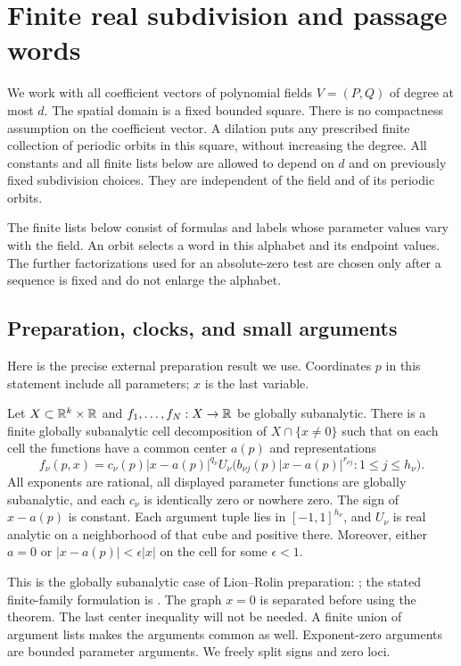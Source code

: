 \section{Finite real subdivision and passage words}
\label{sec:subdivision}

We work with all coefficient vectors of polynomial fields $V=(P,Q)$ of
degree at most $d$.  The spatial domain is a fixed bounded square.
There is no compactness assumption on the coefficient vector.  A dilation
puts any prescribed finite collection of periodic orbits in this square,
without increasing the degree.  All constants and all finite lists below
are allowed to depend on $d$ and on previously fixed subdivision choices.
They are independent of the field and of its periodic orbits.

The finite lists below consist of formulas and labels whose parameter
values vary with the field.  An orbit selects a word in this alphabet
and its endpoint values.  The further factorizations used for an
absolute-zero test are chosen only after a sequence is fixed and do
not enlarge the alphabet.

\subsection{Preparation, clocks, and small arguments}

Here is the precise external preparation result we use.  Coordinates $p$
in this statement include all parameters; $x$ is the last variable.

\begin{theorem}
\label{thm:subdivision-preparation}
Let $X\subset\mathbb{R}^k\times\mathbb{R}$ and $f_1,\ldots,f_N:X\to\mathbb{R}$ be
globally subanalytic.  There is a finite globally subanalytic cell
decomposition of $X\cap\{x\ne0\}$ such that on each cell the functions
have a common center $a(p)$ and representations
\[
 f_\nu(p,x)=c_\nu(p)|x-a(p)|^{q_\nu}
 U_\nu\bigl(b_{\nu j}(p)|x-a(p)|^{r_{\nu j}}:1\le j\le h_\nu\bigr).
\]
All exponents are rational, all displayed parameter functions are globally
subanalytic, and each $c_\nu$ is identically zero or nowhere zero.
The sign of $x-a(p)$ is constant.  Each argument tuple lies in
$[-1,1]^{h_\nu}$, and $U_\nu$ is real analytic on a neighborhood of that
cube and positive there.  Moreover, either $a=0$ or
$|x-a(p)|<\epsilon|x|$ on the cell for some $\epsilon<1$.
\end{theorem}

This is the globally subanalytic case of Lion--Rolin preparation:
\cite[\S0.3, Theorem~1 in \S0.4, and \S1.1(5)]{LionRolin1997};
the stated finite-family formulation is
\cite[Definition~2.14 and Fact~2.15]{Opris2023}.
The graph $x=0$ is separated before using the theorem.  The last
center inequality will not be needed.  A finite union of argument lists
makes the arguments common as well.  Exponent-zero arguments are bounded
parameter arguments.  We freely split signs and zero loci.


